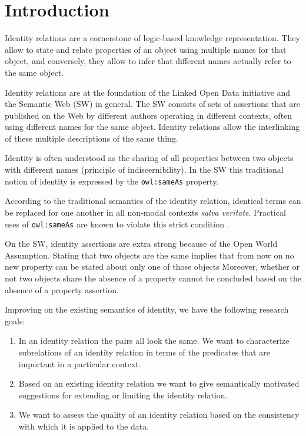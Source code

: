 \section{Introduction}
\label{sec:introduction}

Identity relations are a cornerstone of logic-based knowledge representation.
They allow to state and relate properties of an object
  using multiple names for that object, and conversely,
  they allow to infer that different names actually refer to the same object.

Identity relations are
  at the foundation of the Linked Open Data initiative
  and the Semantic Web (SW) in general.
The SW consists of sets of assertions that are published on the Web
  by different authors operating in different contexts,
  often using different names for the same object.
Identity relations allow the interlinking of these multiple descriptions
  of the same thing.

Identity is often understood as the sharing of all properties between
  two objects with different names (principle of indiscernibility).
In the SW this traditional notion of identity is expressed by
  the \texttt{owl:sameAs} property.

\noindent According to the traditional semantics of the identity relation,
  identical terms can be replaced for one another in all non-modal contexts
  \emph{salva veritate}.
Practical uses of \texttt{owl:sameAs} are known to violate this
  strict condition
  \cite{HalpinHayes2010,HalpinHayesMccuskerMcguinnessThompson2010}.

On the SW,
  identity assertions are extra strong because of the Open World Assumption.
Stating that two objects are the same
  implies that from now on no new property can be stated about
  only one of those objects
Moreover, whether or not two objects share the absence of a property
  cannot be concluded based on the absence of a property assertion.

Improving on the existing semantics of identity,
  we have the following research goals:
\begin{enumerate}
\item In an identity relation the pairs all look the same.
      We want to characterize subrelations of an identity relation in terms
      of the predicates that are important in a particular context.
\item Based on an existing identity relation we want to give semantically
      motivated suggestions for extending or limiting the identity relation.
\item We want to assess the quality of an identity relation based on
      the consistency with which it is applied to the data.
\end{enumerate}


